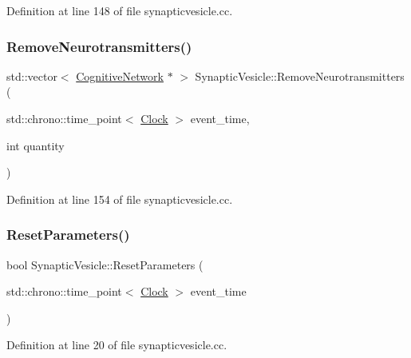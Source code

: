 Definition at line 148 of file synapticvesicle.\+cc.

\mbox{\label{class_synaptic_vesicle_aab1e61b4910399d56071ca59f2758e72}} 
\subsubsection{\texorpdfstring{Remove\+Neurotransmitters()}{RemoveNeurotransmitters()}}
{\footnotesize\ttfamily std\+::vector$<$ \mbox{\hyperlink{class_cognitive_network}{Cognitive\+Network}} $\ast$ $>$ Synaptic\+Vesicle\+::\+Remove\+Neurotransmitters (\begin{DoxyParamCaption}\item[{std\+::chrono\+::time\+\_\+point$<$ \mbox{\hyperlink{universe_8h_a0ef8d951d1ca5ab3cfaf7ab4c7a6fd80}{Clock}} $>$}]{event\+\_\+time,  }\item[{int}]{quantity }\end{DoxyParamCaption})}



Definition at line 154 of file synapticvesicle.\+cc.

\mbox{\label{class_synaptic_vesicle_add2f2815448729977fbcdbd5a59ec7b4}} 
\subsubsection{\texorpdfstring{Reset\+Parameters()}{ResetParameters()}}
{\footnotesize\ttfamily bool Synaptic\+Vesicle\+::\+Reset\+Parameters (\begin{DoxyParamCaption}\item[{std\+::chrono\+::time\+\_\+point$<$ \mbox{\hyperlink{universe_8h_a0ef8d951d1ca5ab3cfaf7ab4c7a6fd80}{Clock}} $>$}]{event\+\_\+time }\end{DoxyParamCaption})}



Definition at line 20 of file synapticvesicle.\+cc.


